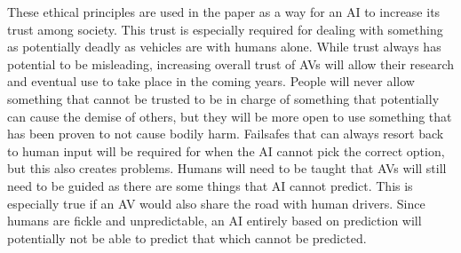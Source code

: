 \documentclass{article}
\begin{document}
   These ethical principles are used in the paper as a way for an AI to increase its trust among society.
   This trust is especially required for dealing with something as potentially deadly as vehicles are with humans alone.
   While trust always has potential to be misleading, increasing overall trust of AVs will allow their research and eventual use to take place in the coming years.
   People will never allow something that cannot be trusted to be in charge of something that potentially can cause the demise of others, but they will be more open to use something that has been proven to not cause bodily harm.
   Failsafes that can always resort back to human input will be required for when the AI cannot pick the correct option, but this also creates problems.
   Humans will need to be taught that AVs will still need to be guided as there are some things that AI cannot predict.
   This is especially true if an AV would also share the road with human drivers.
   Since humans are fickle and unpredictable, an AI entirely based on prediction will potentially not be able to predict that which cannot be predicted.
   
\end{document}
